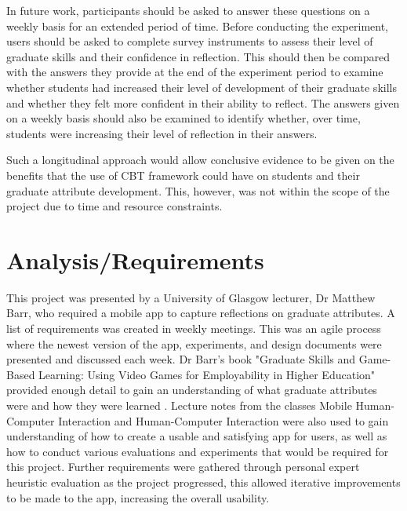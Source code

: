 \documentclass{l4proj}
\begin{document}
In future work, participants should be asked to answer these questions on a weekly basis for an extended period of time. Before conducting the experiment, users should be asked to complete survey instruments to assess their level of graduate skills and their confidence in reflection. This should then be compared with the answers they provide at the end of the experiment period to examine whether students had increased their level of development of their graduate skills and whether they felt more confident in their ability to reflect. The answers given on a weekly basis should also be examined to identify whether, over time, students were increasing their level of reflection in their answers. 

Such a longitudinal approach would allow conclusive evidence to be given on the benefits that the use of CBT framework could have on students and their graduate attribute development. This, however, was not within the scope of the project due to time and resource constraints.
 



\chapter{Analysis/Requirements} \label{analysis/reqs}

This project was presented by a University of Glasgow lecturer, Dr Matthew Barr, who required a mobile app to capture reflections on graduate attributes. A list of requirements was created in weekly meetings. This was an agile process where the newest version of the app, experiments, and design documents were presented and discussed each week. Dr Barr's book "Graduate Skills and Game-Based Learning: Using Video Games for Employability in Higher Education" provided enough detail to gain an understanding of what graduate attributes were and how they were learned \citep{barr_2019}. Lecture notes from the classes Mobile Human-Computer Interaction and Human-Computer Interaction were also used to gain understanding of how to create a usable and satisfying app for users, as well as how to conduct various evaluations and experiments that would be required for this project. Further requirements were gathered through personal expert heuristic evaluation as the project progressed, this allowed iterative improvements to be made to the app, increasing the overall usability.
\end{document}
